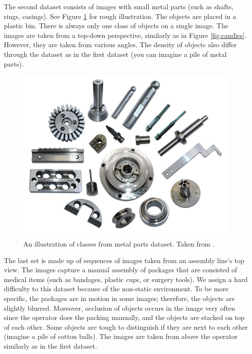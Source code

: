  The second dataset consists of images with small metal parts (such as shafts, rings, casings). See Figure \ref{fig:parts} for rough illustration. The objects are placed in a plastic bin. There is always only one class of objects on a single image. The images are taken from a top-down perspective, similarly as in Figure \ref{fig:candies}. However, they are taken from various angles. The density of objects also differ through the dataset as in the first dataset (you can imagine a pile of metal parts).

\begin{figure}[ht]
	\centering
	\includegraphics[height=0.35\linewidth]{Sources/Figures/metal_parts.jpg}
	\caption{An illustration of classes from metal parts dataset. Taken from \cite{parts}.}
	\label{fig:parts}
\end{figure}

 The last set is made up of sequences of images taken from an assembly line's top view. The images capture a manual assembly of packages that are consisted of medical items (such as bandages, plastic cups, or surgery tools). We assign a hard difficulty to this dataset because of the non-static environment. To be more specific, the packages are in motion in some images; therefore, the objects are slightly blurred. Moreover, occlusion of objects occurs in the image very often since the operator does the packing manually, and the objects are stacked on top of each other. Some objects are tough to distinguish if they are next to each other (imagine a pile of cotton balls). The images are taken from above the operator similarly as in the first dataset.

